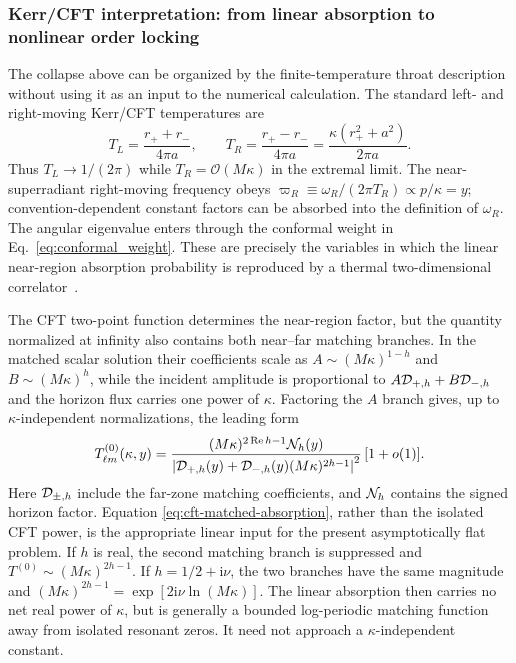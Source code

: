 \documentclass[aps,prd,twocolumn,10pt,nofootinbib,superscriptaddress,floatfix]{revtex4-2}
\newcommand{\ii}{\mathrm{i}}
\newcommand{\calO}{\mathcal{O}}
\begin{document}
\subsubsection{Kerr/CFT interpretation: from linear absorption to nonlinear order locking}

The collapse above can be organized by the finite-temperature throat
description without using it as an input to the numerical calculation.  The
standard left- and right-moving Kerr/CFT temperatures are
\begin{equation}
 T_L=\frac{r_++r_-}{4\pi a},\qquad
 T_R=\frac{r_+-r_-}{4\pi a}
 =\frac{\kappa(r_+^2+a^2)}{2\pi a}.
 \label{eq:cft-temperatures}
\end{equation}
Thus $T_L\to1/(2\pi)$ while $T_R=\calO(M\kappa)$ in the extremal limit.
The near-superradiant right-moving frequency obeys
$\varpi_R\equiv\omega_R/(2\pi T_R)\propto p/\kappa=y$; convention-dependent
constant factors can be absorbed into the definition of $\omega_R$.  The
angular eigenvalue enters through the conformal weight in
Eq.~\eqref{eq:conformal_weight}.  These are precisely the variables in which
the linear near-region absorption probability is reproduced by a thermal
two-dimensional correlator~\cite{BredbergKerrCFT2010,HartmanKerrCFT2010,
CastroHiddenCFT2010}.

The CFT two-point function determines the near-region factor, but the quantity
normalized at infinity also contains both near--far matching branches.  In
the matched scalar solution their coefficients scale as
$A\sim(M\kappa)^{1-h}$ and $B\sim(M\kappa)^h$, while the incident amplitude is
proportional to $A{\cal D}_{+,h}+B{\cal D}_{-,h}$ and the horizon flux carries
one power of $\kappa$.  Factoring the $A$ branch gives, up to
$\kappa$-independent normalizations, the leading form
\cite{BredbergKerrCFT2010}
\begin{equation}
 T^{(0)}_{\ell m}(\kappa,y)=
 \frac{(M\kappa)^{2\operatorname{Re}h-1}{\cal N}_h(y)}
 {\left|{\cal D}_{+,h}(y)+{\cal D}_{-,h}(y)
 (M\kappa)^{2h-1}\right|^2}\,[1+o(1)] .
 \label{eq:cft-matched-absorption}
\end{equation}
Here ${\cal D}_{\pm,h}$ include the far-zone matching coefficients, and
${\cal N}_h$ contains the signed horizon factor.  Equation
\eqref{eq:cft-matched-absorption}, rather than the isolated CFT power, is the
appropriate linear input for the present asymptotically flat problem.  If $h$
is real, the second matching branch is suppressed and
$T^{(0)}\sim(M\kappa)^{2h-1}$.  If $h=1/2+\ii\nu$, the two branches have the
same magnitude and $(M\kappa)^{2h-1}=\exp[2\ii\nu\ln(M\kappa)]$.  The linear
absorption then carries no net real power of $\kappa$, but is generally a
bounded log-periodic matching function away from isolated resonant zeros.  It
need not approach a $\kappa$-independent constant.
\end{document}
